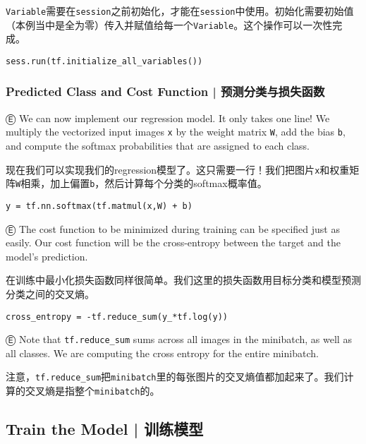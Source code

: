 \lstinline{Variable}需要在\lstinline{session}之前初始化，才能在\lstinline{session}中使用。初始化需要初始值（本例当中是全为零）传入并赋值给每一个\lstinline{Variable}。这个操作可以一次性完成。

\begin{lstlisting}
sess.run(tf.initialize_all_variables())
\end{lstlisting}

%
\subsubsection{Predicted Class and Cost Function  |  预测分类与损失函数}

Ⓔ \textcolor{etc}{We can now implement our regression model. It only takes one line! We multiply the vectorized input images \lstinline{x} by the weight matrix \lstinline{W}, add the bias \lstinline{b}, and compute the softmax probabilities that are assigned to each class.}

现在我们可以实现我们的regression模型了。这只需要一行！我们把图片\lstinline{x}和权重矩阵\lstinline{W}相乘，加上偏置\lstinline{b}，然后计算每个分类的softmax概率值。

\begin{lstlisting}
y = tf.nn.softmax(tf.matmul(x,W) + b)
\end{lstlisting}

Ⓔ \textcolor{etc}{The cost function to be minimized during training can be specified just as easily. Our cost function will be the cross-entropy between the target and the model's prediction.}

在训练中最小化损失函数同样很简单。我们这里的损失函数用目标分类和模型预测分类之间的交叉熵。

\begin{lstlisting}
cross_entropy = -tf.reduce_sum(y_*tf.log(y))
\end{lstlisting}

Ⓔ \textcolor{etc}{Note that \lstinline{tf.reduce_sum} sums across all images in the minibatch, as well as all classes. We are computing the cross entropy for the entire minibatch.}

注意，\lstinline{tf.reduce_sum}把\lstinline{minibatch}里的每张图片的交叉熵值都加起来了。我们计算的交叉熵是指整个\lstinline{minibatch}的。

%
\subsection{Train the Model | 训练模型}

